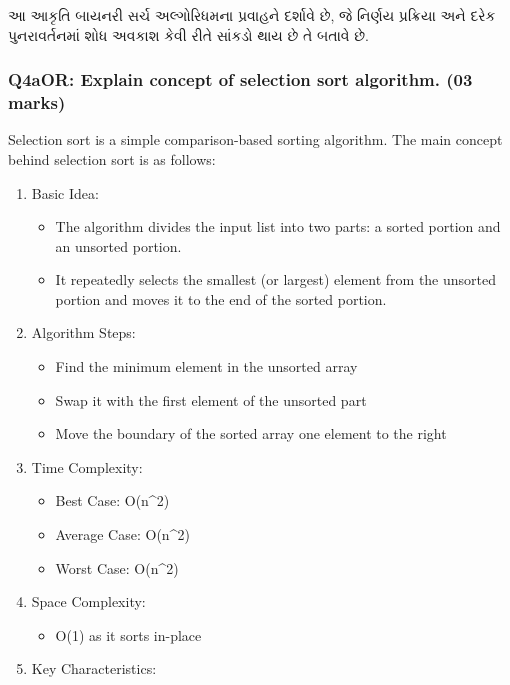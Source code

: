 આ આકૃતિ બાયનરી સર્ચ અલ્ગોરિધમના પ્રવાહને દર્શાવે છે, જે નિર્ણય પ્રક્રિયા અને દરેક
પુનરાવર્તનમાં શોધ અવકાશ કેવી રીતે સાંકડો થાય છે તે બતાવે છે.

\hypertarget{q4aor-explain-concept-of-selection-sort-algorithm.-03-marks}{%
\subsubsection{Q4aOR: Explain concept of selection sort algorithm. (03
marks)}\label{q4aor-explain-concept-of-selection-sort-algorithm.-03-marks}}

Selection sort is a simple comparison-based sorting algorithm. The main
concept behind selection sort is as follows:

\begin{enumerate}
\def\labelenumi{\arabic{enumi}.}
\tightlist
\item
  Basic Idea:

  \begin{itemize}
  \tightlist
  \item
    The algorithm divides the input list into two parts: a sorted
    portion and an unsorted portion.
  \item
    It repeatedly selects the smallest (or largest) element from the
    unsorted portion and moves it to the end of the sorted portion.
  \end{itemize}
\item
  Algorithm Steps:

  \begin{itemize}
  \tightlist
  \item
    Find the minimum element in the unsorted array
  \item
    Swap it with the first element of the unsorted part
  \item
    Move the boundary of the sorted array one element to the right
  \end{itemize}
\item
  Time Complexity:

  \begin{itemize}
  \tightlist
  \item
    Best Case: O(n\^{}2)
  \item
    Average Case: O(n\^{}2)
  \item
    Worst Case: O(n\^{}2)
  \end{itemize}
\item
  Space Complexity:

  \begin{itemize}
  \tightlist
  \item
    O(1) as it sorts in-place
  \end{itemize}
\item
  Key Characteristics:


\end{enumerate}
